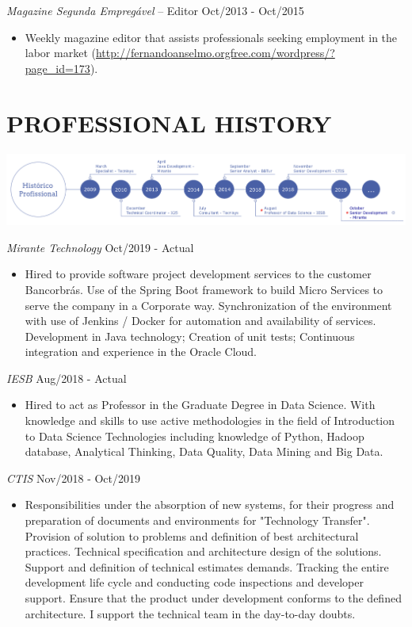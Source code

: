 \documentclass{res}
\begin{document}
\begin{resume}
		{\sl Magazine Segunda Empregável} -- Editor \hfill Oct/2013 - Oct/2015
		\begin{itemize}
			\item Weekly magazine editor that assists professionals seeking employment in the labor 
			market (\url{http://fernandoanselmo.orgfree.com/wordpress/?page_id=173}).
		\end{itemize}
		
		\section{PROFESSIONAL HISTORY} %
		\vspace{8pt}
		\includegraphics[width=1.0\textwidth]{imagens/experience}
		
		{\sl Mirante Technology} \hfill Oct/2019 - Actual
		\begin{itemize}
			\item Hired to provide software project development services to the customer Bancorbrás. Use of the Spring Boot framework to build Micro Services to serve the company in a Corporate way. Synchronization of the environment with use of Jenkins / Docker for automation and availability of services. Development in Java technology; Creation of unit tests; Continuous integration and experience in the Oracle Cloud. 
		\end{itemize}
		
		{\sl IESB} \hfill Aug/2018 - Actual
		\begin{itemize}
			\item Hired to act as Professor in the Graduate Degree in Data Science. With knowledge and skills to use active methodologies in the field of Introduction to Data Science Technologies including knowledge of Python, Hadoop database, Analytical Thinking, Data Quality, Data Mining and Big Data.
		\end{itemize}
		
		{\sl CTIS} \hfill Nov/2018 - Oct/2019
		\begin{itemize}
			\item Responsibilities under the absorption of new systems, for their progress and preparation of documents and environments for "Technology Transfer". Provision of solution to problems and definition of best architectural practices. Technical specification and architecture design of the solutions. Support and definition of technical estimates demands. Tracking the entire development life cycle and conducting code inspections and developer support. Ensure that the product under development conforms to the defined architecture. I support the technical team in the day-to-day doubts.
		\end{itemize}
		

\end{resume}
\end{document}
